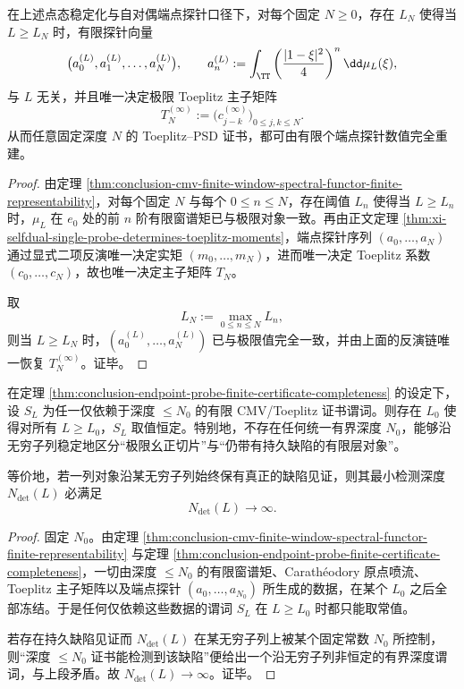 \begin{theorem}[端点探针的有限证书完备性]\label{thm:conclusion-endpoint-probe-finite-certificate-completeness}
在上述点态稳定化与自对偶端点探针口径下，对每个固定 \(N\ge 0\)，存在 \(L_N\) 使得当 \(L\ge L_N\) 时，有限探针向量
\[
\bigl(a_0^{(L)},a_1^{(L)},\dots,a_N^{(L)}\bigr),
\qquad
a_n^{(L)}
:=
\int_{\TT}\left(\frac{|1-\xi|^2}{4}\right)^n\dd\mu_L(\xi),
\]
与 \(L\) 无关，并且唯一决定极限 Toeplitz 主子矩阵
\[
T_N^{(\infty)}:=\bigl(c_{j-k}^{(\infty)}\bigr)_{0\le j,k\le N}.
\]
从而任意固定深度 \(N\) 的 Toeplitz--PSD 证书，都可由有限个端点探针数值完全重建。
\end{theorem}
\begin{proof}
由定理 \ref{thm:conclusion-cmv-finite-window-spectral-functor-finite-representability}，对每个固定 \(N\) 与每个 \(0\le n\le N\)，存在阈值 \(L_n\) 使得当 \(L\ge L_n\) 时，\(\mu_L\) 在 \(e_0\) 处的前 \(n\) 阶有限窗谱矩已与极限对象一致。再由正文定理 \ref{thm:xi-selfdual-single-probe-determines-toeplitz-moments}，端点探针序列 \((a_0,\dots,a_N)\) 通过显式二项反演唯一决定实矩 \((m_0,\dots,m_N)\)，进而唯一决定 Toeplitz 系数 \((c_0,\dots,c_N)\)，故也唯一决定主子矩阵 \(T_N\)。

取
\[
L_N:=\max_{0\le n\le N}L_n,
\]
则当 \(L\ge L_N\) 时，\((a_0^{(L)},\dots,a_N^{(L)})\) 已与极限值完全一致，并由上面的反演链唯一恢复 \(T_N^{(\infty)}\)。证毕。
\end{proof}

\begin{theorem}[有界深度可分离性的极限不可能]\label{thm:conclusion-bounded-depth-inseparability-under-cmv-freeze}
在定理 \ref{thm:conclusion-endpoint-probe-finite-certificate-completeness} 的设定下，设 \(S_L\) 为任一仅依赖于深度 \(\le N_0\) 的有限 CMV/Toeplitz 证书谓词。则存在 \(L_0\) 使得对所有 \(L\ge L_0\)，\(S_L\) 取值恒定。特别地，不存在任何统一有界深度 \(N_0\)，能够沿无穷子列稳定地区分“极限幺正切片”与“仍带有持久缺陷的有限层对象”。

等价地，若一列对象沿某无穷子列始终保有真正的缺陷见证，则其最小检测深度 \(N_{\det}(L)\) 必满足
\[
N_{\det}(L)\longrightarrow\infty.
\]
\end{theorem}
\begin{proof}
固定 \(N_0\)。由定理 \ref{thm:conclusion-cmv-finite-window-spectral-functor-finite-representability} 与定理 \ref{thm:conclusion-endpoint-probe-finite-certificate-completeness}，一切由深度 \(\le N_0\) 的有限窗谱矩、Carath\'eodory 原点喷流、Toeplitz 主子矩阵以及端点探针 \((a_0,\dots,a_{N_0})\) 所生成的数据，在某个 \(L_0\) 之后全部冻结。于是任何仅依赖这些数据的谓词 \(S_L\) 在 \(L\ge L_0\) 时都只能取常值。

若存在持久缺陷见证而 \(N_{\det}(L)\) 在某无穷子列上被某个固定常数 \(N_0\) 所控制，则“深度 \(\le N_0\) 证书能检测到该缺陷”便给出一个沿无穷子列非恒定的有界深度谓词，与上段矛盾。故 \(N_{\det}(L)\to\infty\)。证毕。
\end{proof}

